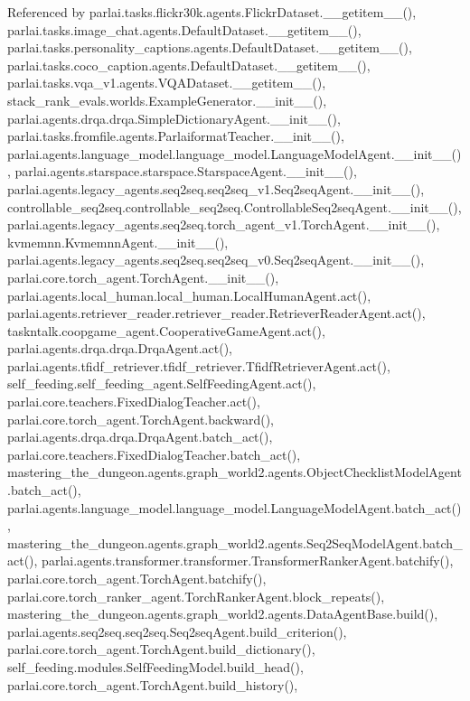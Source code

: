 Referenced by parlai.\+tasks.\+flickr30k.\+agents.\+Flickr\+Dataset.\+\_\+\+\_\+getitem\+\_\+\+\_\+(), parlai.\+tasks.\+image\+\_\+chat.\+agents.\+Default\+Dataset.\+\_\+\+\_\+getitem\+\_\+\+\_\+(), parlai.\+tasks.\+personality\+\_\+captions.\+agents.\+Default\+Dataset.\+\_\+\+\_\+getitem\+\_\+\+\_\+(), parlai.\+tasks.\+coco\+\_\+caption.\+agents.\+Default\+Dataset.\+\_\+\+\_\+getitem\+\_\+\+\_\+(), parlai.\+tasks.\+vqa\+\_\+v1.\+agents.\+V\+Q\+A\+Dataset.\+\_\+\+\_\+getitem\+\_\+\+\_\+(), stack\+\_\+rank\+\_\+evals.\+worlds.\+Example\+Generator.\+\_\+\+\_\+init\+\_\+\+\_\+(), parlai.\+agents.\+drqa.\+drqa.\+Simple\+Dictionary\+Agent.\+\_\+\+\_\+init\+\_\+\+\_\+(), parlai.\+tasks.\+fromfile.\+agents.\+Parlaiformat\+Teacher.\+\_\+\+\_\+init\+\_\+\+\_\+(), parlai.\+agents.\+language\+\_\+model.\+language\+\_\+model.\+Language\+Model\+Agent.\+\_\+\+\_\+init\+\_\+\+\_\+(), parlai.\+agents.\+starspace.\+starspace.\+Starspace\+Agent.\+\_\+\+\_\+init\+\_\+\+\_\+(), parlai.\+agents.\+legacy\+\_\+agents.\+seq2seq.\+seq2seq\+\_\+v1.\+Seq2seq\+Agent.\+\_\+\+\_\+init\+\_\+\+\_\+(), controllable\+\_\+seq2seq.\+controllable\+\_\+seq2seq.\+Controllable\+Seq2seq\+Agent.\+\_\+\+\_\+init\+\_\+\+\_\+(), parlai.\+agents.\+legacy\+\_\+agents.\+seq2seq.\+torch\+\_\+agent\+\_\+v1.\+Torch\+Agent.\+\_\+\+\_\+init\+\_\+\+\_\+(), kvmemnn.\+Kvmemnn\+Agent.\+\_\+\+\_\+init\+\_\+\+\_\+(), parlai.\+agents.\+legacy\+\_\+agents.\+seq2seq.\+seq2seq\+\_\+v0.\+Seq2seq\+Agent.\+\_\+\+\_\+init\+\_\+\+\_\+(), parlai.\+core.\+torch\+\_\+agent.\+Torch\+Agent.\+\_\+\+\_\+init\+\_\+\+\_\+(), parlai.\+agents.\+local\+\_\+human.\+local\+\_\+human.\+Local\+Human\+Agent.\+act(), parlai.\+agents.\+retriever\+\_\+reader.\+retriever\+\_\+reader.\+Retriever\+Reader\+Agent.\+act(), taskntalk.\+coopgame\+\_\+agent.\+Cooperative\+Game\+Agent.\+act(), parlai.\+agents.\+drqa.\+drqa.\+Drqa\+Agent.\+act(), parlai.\+agents.\+tfidf\+\_\+retriever.\+tfidf\+\_\+retriever.\+Tfidf\+Retriever\+Agent.\+act(), self\+\_\+feeding.\+self\+\_\+feeding\+\_\+agent.\+Self\+Feeding\+Agent.\+act(), parlai.\+core.\+teachers.\+Fixed\+Dialog\+Teacher.\+act(), parlai.\+core.\+torch\+\_\+agent.\+Torch\+Agent.\+backward(), parlai.\+agents.\+drqa.\+drqa.\+Drqa\+Agent.\+batch\+\_\+act(), parlai.\+core.\+teachers.\+Fixed\+Dialog\+Teacher.\+batch\+\_\+act(), mastering\+\_\+the\+\_\+dungeon.\+agents.\+graph\+\_\+world2.\+agents.\+Object\+Checklist\+Model\+Agent.\+batch\+\_\+act(), parlai.\+agents.\+language\+\_\+model.\+language\+\_\+model.\+Language\+Model\+Agent.\+batch\+\_\+act(), mastering\+\_\+the\+\_\+dungeon.\+agents.\+graph\+\_\+world2.\+agents.\+Seq2\+Seq\+Model\+Agent.\+batch\+\_\+act(), parlai.\+agents.\+transformer.\+transformer.\+Transformer\+Ranker\+Agent.\+batchify(), parlai.\+core.\+torch\+\_\+agent.\+Torch\+Agent.\+batchify(), parlai.\+core.\+torch\+\_\+ranker\+\_\+agent.\+Torch\+Ranker\+Agent.\+block\+\_\+repeats(), mastering\+\_\+the\+\_\+dungeon.\+agents.\+graph\+\_\+world2.\+agents.\+Data\+Agent\+Base.\+build(), parlai.\+agents.\+seq2seq.\+seq2seq.\+Seq2seq\+Agent.\+build\+\_\+criterion(), parlai.\+core.\+torch\+\_\+agent.\+Torch\+Agent.\+build\+\_\+dictionary(), self\+\_\+feeding.\+modules.\+Self\+Feeding\+Model.\+build\+\_\+head(), parlai.\+core.\+torch\+\_\+agent.\+Torch\+Agent.\+build\+\_\+history(), 